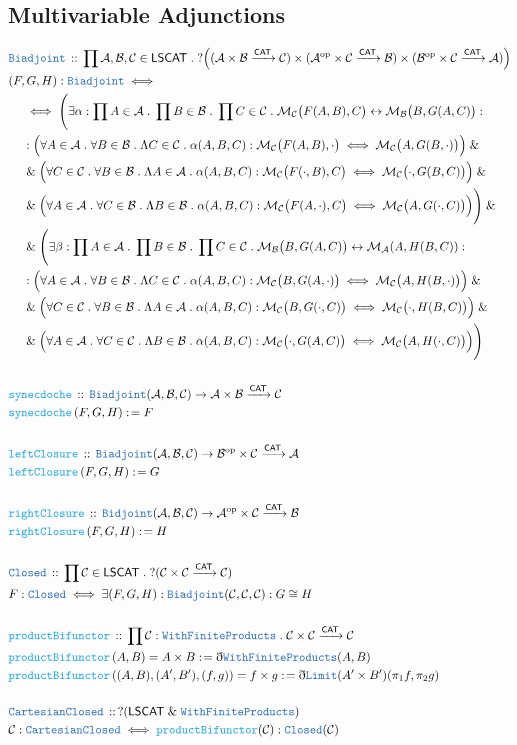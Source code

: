\documentclass[12pt]{scrartcl}
\newcommand{\TYPE}[1]{\textcolor{NavyBlue}{\mathtt{#1}}}
\newcommand{\FUNC}[1]{\textcolor{Cerulean}{\mathtt{#1}}}
\renewcommand{\.}{\; . \;}
\newcommand{\de}{: \kern 0.1pc =}
\newcommand{\Act}[1]{\left( #1 \right)}
\newcommand{\DeclareType}[2]{& \TYPE{#1} \, :: \, #2 \\}
\newcommand{\DefineType}[3]{& #1 : \TYPE{#2} \iff #3 \\}
\newcommand{\DeclareFunc}[2]{& \FUNC{#1} \, :: \, #2 \\}
\newcommand{\DefineFunc}[3]{&  \FUNC{#1}\Act{#2} \de #3 \\}
\newcommand{\DefineNamedFunc}[4]{&  \FUNC{#1}\Act{#2} = #3 \de #4 \\}
\newcommand{\NewLine}{\\ & \kern 1pc}
\newcommand{\Page}[1]{ \begin{align*} #1 \end{align*}   }
\newcommand{ \bd }{ \ByDef }
\renewcommand{\And}{\; \& \;}
\newcommand{\Mor}{\mathcal{M}}
\newcommand{\ToBij}{\leftrightarrow}
\newcommand{\Arrow}{\xrightarrow}
\newcommand{\ByDef}{\eth}
\newcommand{\op}{\mathrm{op}}
\newcommand{\C}{\mathcal{C}}
\newcommand{\A}{\mathcal{A}}
\newcommand{\B}{\mathcal{B}}
\newcommand{\CAT}{\mathsf{CAT}}
\begin{document}
\subsection{Multivariable Adjunctions}
\Page{
	\DeclareType{Biadjoint}{ 
		\prod \A,\B,\C \in \mathsf{LSCAT} \. 
		?\Big( 
			(\A \times \B \Arrow{\CAT} \C) \times
			(\A^\op \times \C \Arrow{\CAT} \B) \times
			(\B^\op \times \C \Arrow{\CAT} \A)
		\Big)  
	}
	\DefineType{ (F,G,H) }{Biadjoint}{   
		\NewLine \iff \Bigg(  \exists
			\alpha : \prod A \in \A \. 
			\prod B \in \B \. 
			\prod C \in \C \.  
			\Mor_\C\big(F(A,B),C\big) \ToBij \Mor_\B\big(B,G(A,C)\big) : \NewLine :
			\Big(	\forall A \in \A \. 
				\forall B \in \B \.
				\Lambda C \in \C  \. 
				\alpha(A,B,C) :  \Mor_{\C}\big( F(A,B),\cdot\big) \iff  \Mor_{\C}\big(A,G(B,\cdot)\big)
			\Big) \And \NewLine \And
			\Big(	\forall C \in \C \.
				\forall B \in \B \.
				\Lambda A \in \A  \. 
				\alpha(A,B,C) :  \Mor_{\C}\big( F(\cdot,B),C\big) \iff  \Mor_{\C}\big(\cdot,G(B,C)\big)
			\Big) \And \NewLine \And
			\Big(	\forall A \in \A \.
				\forall C \in \B \.
				\Lambda B \in \B  \. 
				\alpha(A,B,C) :  \Mor_{\C}\big( F(A,\cdot),C\big) \iff  \Mor_{\C}\big(A,G(\cdot,C)\big)
			\Big) 
		\Bigg) \And \NewLine \And \Bigg(
			\exists \beta :
			\prod A \in \A \.
			\prod B \in \B \.
			\prod C \in \C \.
			\Mor_\B\big(B,G(A,C)\big) \ToBij \Mor_\A(A,H(B,C)) : \NewLine :
			\Big( \forall A \in \A \.
			      \forall B \in \B \.
			      \Lambda C \in \C \.
			      \alpha(A,B,C) : \Mor_{\C}\big(B, G(A,\cdot)\big) \iff \Mor_{\C}\big(A,H(B,\cdot)\big)
			\Big) \And \NewLine \And
			\Big( \forall C \in \C \.
			      \forall B \in \B \.
			      \Lambda A \in \A \.
			      \alpha(A,B,C) : \Mor_{\C}\big(B, G(\cdot,C)\big) \iff \Mor_{\C}\big(\cdot,H(B,C)\big)
			\Big) \And \NewLine \And
			\Big( \forall A \in \A \.
			      \forall C \in \C \.
			      \Lambda B \in \B \.
			      \alpha(A,B,C) : \Mor_{\C}\big(\cdot, G(A,C)\big) \iff \Mor_{\C}\big(A,H(\cdot,C)\big)
			\Big) \Bigg) 
	}
	\\
	\DeclareFunc{synecdoche}{\TYPE{Biadjoint}(\A,\B,\C) \to \A \times \B \Arrow{\CAT} \C }
	\DefineFunc{synecdoche}{F,G,H}{F}
	\\
	\DeclareFunc{leftClosure}{\TYPE{Biadjoint}(\A,\B,\C) \to \B^\op \times \C \Arrow{\CAT} \A}
	\DefineFunc{leftClosure}{F,G,H}{G}
	\\
	\DeclareFunc{rightClosure}{\TYPE{Bidjoint}(\A,\B,\C) \to \A^\op \times \C \Arrow{\CAT} \B}
	\DefineFunc{rightClosure}{F,G,H}{H}
	\\
	\DeclareType{Closed}{ \prod \C \in \mathsf{LSCAT} \. ?( \C \times \C \Arrow{\CAT} \C) }
	\DefineType{F}{Closed}{\exists (F,G,H) : \TYPE{Biadjoint}(\C,\C,\C) : G \cong H }
	\\
	\DeclareFunc{productBifunctor}{\prod \C : \TYPE{WithFiniteProducts} \. \C \times \C \Arrow{\CAT} \C}
	\DefineNamedFunc{productBifunctor}{A,B}{A \times B}{\bd \TYPE{WithFiniteProducts}(A,B)}
	\DefineNamedFunc{productBifunctor}{(A,B),(A',B'),(f,g)}{f \times g}{\bd \TYPE{Limit}(A' \times B')(\pi_1f,\pi_2g)}
	\\
	\DeclareType{CartesianClosed}{? (\mathsf{LSCAT} \And \TYPE{WithFiniteProducts})}
	\DefineType{\C}{CartesianClosed}{\FUNC{productBifunctor}(\C) : \TYPE{Closed}(\C)}
}
\end{document}
